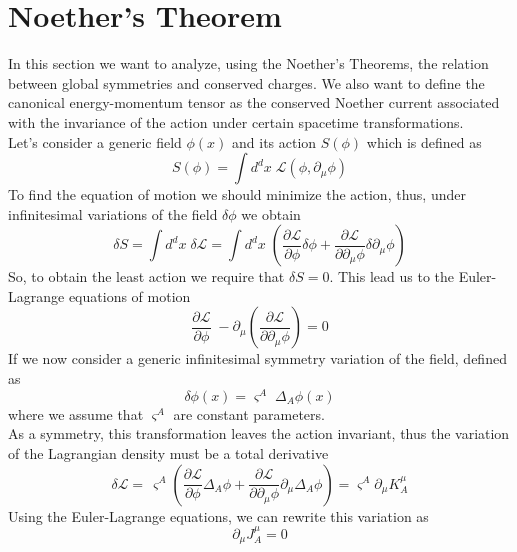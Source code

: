 \documentclass[a4paper,10pt]{article}
\begin{document}
\section{Noether's Theorem}
In this section we want to analyze, using the Noether's Theorems, the relation between global symmetries and conserved charges. We also want to define the canonical energy-momentum tensor as the conserved Noether current associated with the invariance of the action under certain spacetime transformations.\\
Let's consider a generic field $\phi(x)$ and its action $ S(\phi)$ which is defined as
\begin{equation}
 S(\phi)=\int { d^dx\; \mathcal{L} \left( \phi, \partial_\mu \phi \right)}
\end{equation}
To find the equation of motion we should minimize the action, thus, under infinitesimal variations of the field $\delta \phi$ we obtain
\begin{equation}
 \delta S = \int{ d^dx\;\delta \mathcal{L}}= \int{ d^dx\;( \frac{\partial \mathcal{L}}{\partial \phi} \delta \phi + \frac{\partial \mathcal{L}}{\partial \partial_\mu \phi} \delta \partial_\mu \phi)}
\end{equation}
So, to obtain the least action we require that $\delta S =0$. This lead us to the Euler-Lagrange equations of motion
\begin{equation}
 \frac{\partial \mathcal{L}}{\partial \phi}\;-\partial_\mu \left(\frac{\partial \mathcal{L}}{\partial \partial_\mu \phi}\right)=0
\end{equation}
If we now consider a generic infinitesimal symmetry variation of the field, defined as
\begin{equation}
 \delta \phi(x)= \varsigma^A \; \Delta_A \phi(x)
\end{equation}
where we assume that $\varsigma^A$ are constant parameters.\\
As a symmetry, this transformation leaves the action invariant, thus the variation of the Lagrangian density must be a total derivative
\begin{equation}
 \delta \mathcal{L}= \, \varsigma^A \left(\frac{\partial \mathcal{L}}{\partial \phi}\Delta_A\phi +\frac{\partial \mathcal{L}}{\partial \partial_\mu \phi}\partial_\mu \Delta_A \phi \right)= \varsigma^A \partial_\mu K^\mu_A
\end{equation}
Using the Euler-Lagrange equations, we can rewrite this variation as
\begin{equation}
 \partial_\mu J^\mu_A=0
\end{equation}
\end{document}
